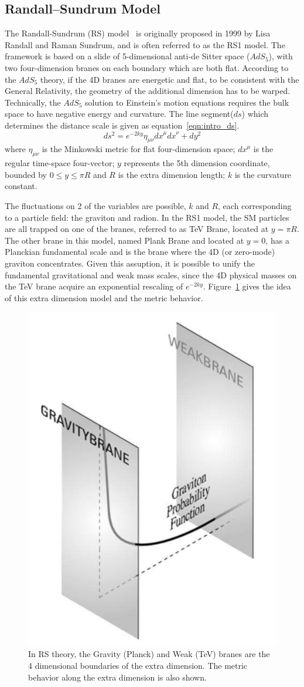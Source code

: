 \subsection{Randall–Sundrum Model}
The Randall-Sundrum (RS) model~\cite{Intro_RS1} is originally proposed in 1999 by Lisa Randall and Raman Sundrum, and is often referred to as the RS1 model. The framework is based on a slide of 5-dimensional anti-de Sitter space ($AdS_{5}$), with two four-dimension branes on each boundary which are both flat. According to the $AdS_{5}$ theory, if the 4D branes are energetic and flat, to be consistent with the General Relativity, the geometry of the additional dimension has to be warped. Technically, the $AdS_{5}$ solution to Einstein's motion equations requires the bulk space to have negative energy and curvature. The line segment($ds$) which determines the distance scale is given as equation~\ref{eqn:intro_ds}.
\begin{equation}
ds^2 = e^{-2ky}{\eta}_{\mu\nu}{dx}^{\mu}{dx}^{\nu}+dy^2
\label{eqn:intro_ds}
\end{equation}
where ${\eta}_{\mu\nu}$ is the Minkowski metric for flat four-dimension space; ${dx}^{\mu}$ is the regular time-space four-vector; $y$ represents the 5th dimension coordinate, bounded by $0\leq y \leq \pi R$ and $R$ is the extra dimension length; $k$ is the curvature constant.

\vspace{0.3cm}
The fluctuations on 2 of the variables are possible, $k$ and $R$, each corresponding to a particle field: the graviton and radion. In the RS1 model, the SM particles are all trapped on one of the branes, referred to as TeV Brane, located at $y=\pi R$. The other brane in this model, named Plank Brane and located at $y=0$, has a Planckian fundamental scale and is the brane where the 4D (or zero-mode) graviton concentrates. Given this assuption, it is possible to unify the fundamental gravitational and weak mass scales, since the 4D physical masses on the TeV brane acquire an exponential rescaling of $e^{-2ky}$. Figure~\ref{fig:intro_branes} gives the idea of this extra dimension model and the metric behavior.
\begin{figure}[htbp]
\begin{center}
\includegraphics[width=0.32\linewidth]{figures/intro_branes.png}
\caption{In RS theory, the Gravity (Planck) and Weak (TeV) branes are the 4 dimensional boundaries of the extra dimension. The metric behavior along the extra dimension is also shown.}
\label{fig:intro_branes}
\end{center}
\end{figure}

